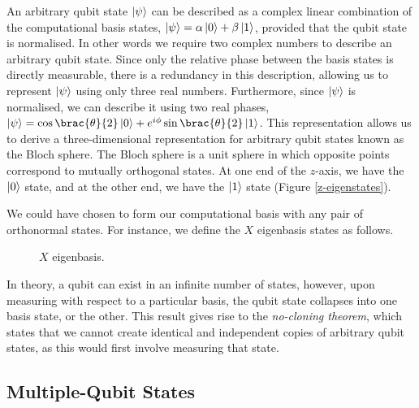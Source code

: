 An arbitrary qubit state $\ket\psi$ can be described as a complex linear combination of the computational basis states, $\ket\psi = \alpha\ket 0 + \beta\ket 1$, provided that the qubit state is normalised. In other words we require two complex numbers to describe an arbitrary qubit state. Since only the relative phase between the basis states is directly measurable, there is a redundancy in this description, allowing us to represent $\ket\psi$ using only three real numbers. Furthermore, since $\ket\psi$ is normalised, we can describe it using two real phases, $\ket\psi = \cos{\brac{\theta}{2}} \ket 0 + e^{i\phi} \sin{\brac{\theta}{2}} \ket 1$. This representation allows us to derive a three-dimensional representation for arbitrary qubit states known as the Bloch sphere. The Bloch sphere is a unit sphere in which opposite points correspond to mutually orthogonal states. At one end of the $z$-axis, we have the $\ket 0$ state, and at the other end, we have the $\ket 1$ state (Figure \ref{z-eigenstates}).

We could have chosen to form our computational basis with any pair of orthonormal states. For instance, we define the $X$ eigenbasis states as follows.

\begin{figure}[H]
    \centering
    \begin{minipage}{.45\textwidth}
        \centering
    \end{minipage}%
    \begin{minipage}{0.45\textwidth}
        \centering
    \end{minipage}
    \caption{$X$ eigenbasis.}
    \label{x-eigenstates}
\end{figure}

In theory, a qubit can exist in an infinite number of states, however, upon measuring with respect to a particular basis, the qubit state collapses into one basis state, or the other. This result gives rise to the \textit{no-cloning theorem}, which states that we cannot create identical and independent copies of arbitrary qubit states, as this would first involve measuring that state.

\subsection{Multiple-Qubit States}

